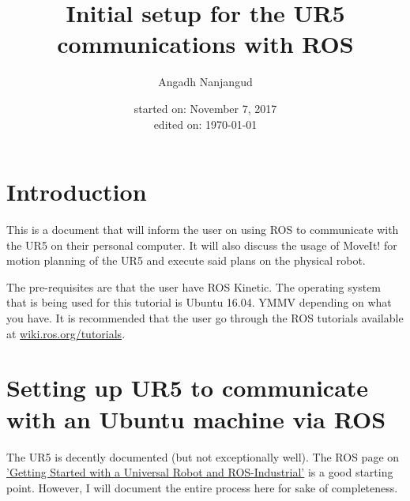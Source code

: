 \documentclass[a4paper]{article}
\title{Initial setup for the UR5 communications with ROS}
\author{Angadh Nanjangud}
\date{started on: November 7, 2017\\ edited on: \today}
\begin{document}
\maketitle

\section{Introduction}
This is a document that will inform the user on using ROS to
communicate with the UR5 on their personal computer. It will
also discuss the usage of MoveIt! for motion planning of the
UR5 and execute said plans on the physical robot.

The pre-requisites are that the user have ROS Kinetic. The
operating system that is being used for this tutorial is
Ubuntu 16.04. YMMV depending on what you have. It is recommended
that the user go through the ROS tutorials available at
\url{wiki.ros.org/tutorials}.

\section{Setting up UR5 to communicate with an Ubuntu machine
via  ROS}
The UR5 is decently documented (but not exceptionally well).
The ROS page on
\href{http://wiki.ros.org/universal_robot/Tutorials/Getting%20Started%20with%20a%20Universal%20Robot%20and%20ROS-Industrial}
{'Getting Started with a Universal Robot and ROS-Industrial'}
is a good starting point. However, I will document the entire
process here for sake of completeness.
\end{document}
